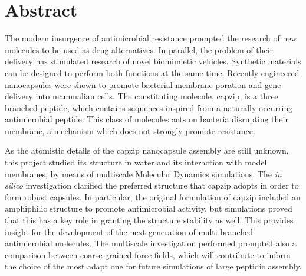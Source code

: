%
%

\clearpage
\thispagestyle{empty}
\chapter*{Abstract}


\begin{onehalfspacing}

\noindent
%
The modern insurgence of antimicrobial resistance prompted the research of new molecules to be used as drug alternatives. In parallel, the problem of their delivery has stimulated research of novel biomimietic vehicles.
%
Synthetic materials can be designed to perform both functions at the same time. Recently engineered nanocapsules were shown to promote bacterial membrane poration and gene delivery into mammalian cells. The constituting molecule, capzip, is a three branched peptide, which contains sequences inspired from a naturally occurring antimicrobial peptide. This class of molecules acts on bacteria disrupting their membrane, a mechanism which does not strongly promote resistance.

As the atomistic details of the capzip nanocapsule assembly are still unknown, this project studied its structure in water and its interaction with model membranes, by means of multiscale Molecular Dynamics simulations. 
%
The \emph{in silico} investigation clarified the preferred structure that capzip adopts in order to form robust capsules.
In particular, the original formulation of capzip included an amphiphilic structure to promote antimicrobial activity, but simulations proved that this has a key role in granting the structure stability as well. This provides insight for the development of the next generation of multi-branched antimicrobial molecules.
%
The multiscale investigation performed prompted also a comparison between coarse-grained force fields, which will contribute to inform the choice of the most adapt one for future simulations of large peptidic assembly.


\end{onehalfspacing}
